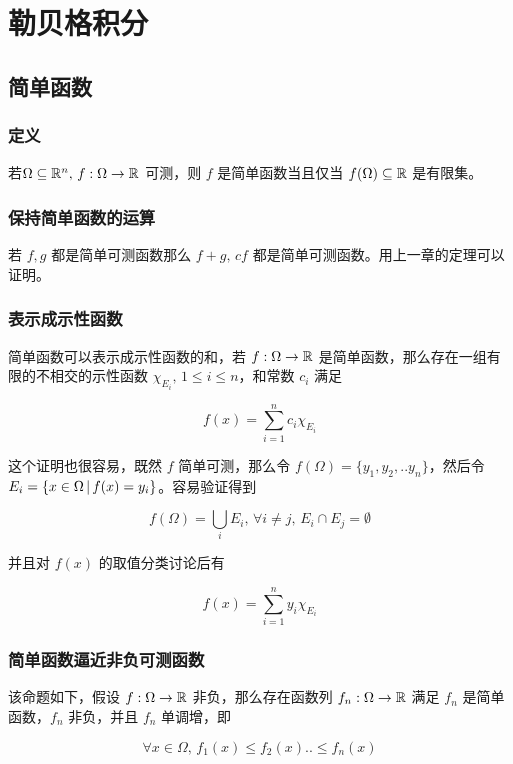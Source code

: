 \chapter{勒贝格积分}

\section{简单函数}

\subsection{定义}

若$\Omega \subseteq \mathbb{R}^{n},\, f: \Omega \to \mathbb{R}$ 可测，则 $f$ 是简单函数当且仅当 $f(\Omega) \subseteq \mathbb{R}$ 是有限集。 

\subsection{保持简单函数的运算}

若 $f,g$ 都是简单可测函数那么
$f + g,\, cf$ 都是简单可测函数。用上一章的定理可以证明。


\subsection{表示成示性函数}

简单函数可以表示成示性函数的和，若 $f: \Omega \to \mathbb{R}$ 是简单函数，那么存在一组有限的不相交的示性函数 $\chi_{E_i},\, 1 \le i \le n$，和常数 $c_i$ 满足

\[
f(x) = \sum_{i=1}^{n}c_i \chi_{E_i}
\]

这个证明也很容易，既然 $f$ 简单可测，那么令 $f(\Omega) = \{ y_1, y_2, .. y_n\}$，然后令 $E_i = \{ x \in \Omega \,\vert\, f(x) = y_i\}$。容易验证得到

\[
f(\Omega) = \bigcup_{i}E_i,\, \forall i \ne j,\, E_i \cap E_j = \emptyset
\]

并且对 $f(x)$ 的取值分类讨论后有 

\[
f(x) = \sum_{i=1}^{n}y_i \chi_{E_i}
\]


\subsection{简单函数逼近非负可测函数}

该命题如下，假设 $f: \Omega \to \mathbb{R}$ 非负，那么存在函数列 $f_n: \Omega \to \mathbb{R}$ 满足 $f_n$ 是简单函数，$f_n$ 非负，并且 $f_n$ 单调增，即

\[
\forall x \in \Omega,\, f_1(x) \le f_2(x) .. \le f_n(x) 
\]

